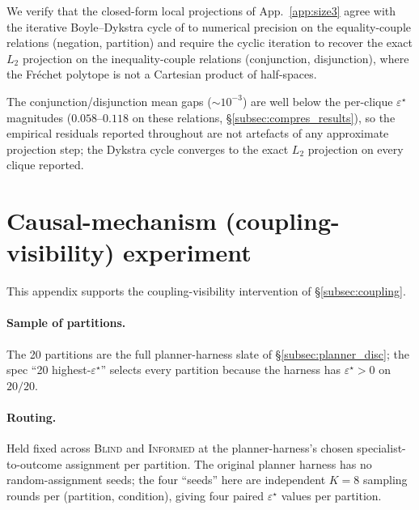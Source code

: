 \documentclass{article}
\theoremstyle{plain}
\theoremstyle{definition}
\theoremstyle{remark}
\newcommand{\eps}{\varepsilon}
\begin{document}
We verify that the closed-form local projections of
App.~\ref{app:size3} agree with the iterative Boyle--Dykstra cycle
of  to numerical precision on the equality-couple
relations (negation, partition) and require the cyclic iteration
to recover the exact $L_2$ projection on the inequality-couple
relations (conjunction, disjunction), where the Fr\'echet polytope
is not a Cartesian product of half-spaces.

\begin{table}[h]
\centering
\small

\caption{Per-relation maximum
$\|\Pi^{\text{closed}}{-}\Pi^{\text{JCD}}\|_\infty$ over the
1,876 ensemble bets. Negation and partition match to numerical
precision; conjunction/disjunction require the cyclic projection
because the Fr\'echet polytope is not a Cartesian product of
half-spaces.}
\label{tab:projgap}
\end{table}

The conjunction/disjunction mean gaps ($\sim\!10^{-3}$) are
well below the per-clique $\eps^\star$ magnitudes
($0.058$--$0.118$ on these relations,
\S\ref{subsec:compres_results}), so the empirical residuals
reported throughout are not artefacts of any approximate
projection step; the Dykstra cycle converges to the exact
$L_2$ projection on every clique reported.

\section{Causal-mechanism (coupling-visibility) experiment}
\label{app:coupling}

This appendix supports the coupling-visibility intervention of
\S\ref{subsec:coupling}.

\paragraph{Sample of partitions.}
The 20 partitions are the full planner-harness slate of
\S\ref{subsec:planner_disc}; the spec ``20 highest-$\eps^\star$''
selects every partition because the harness has
$\eps^\star\!>\!0$ on $20/20$.

\paragraph{Routing.}
Held fixed across \textsc{Blind} and \textsc{Informed} at the
planner-harness's chosen specialist-to-outcome assignment per
partition. The original planner harness has no random-assignment
seeds; the four ``seeds'' here are independent $K\!=\!8$ sampling
rounds per (partition, condition), giving four paired $\eps^\star$
values per partition.
\end{document}
